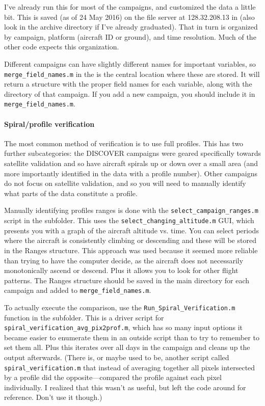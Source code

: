 \documentclass[12pt]{article}
\begin{document}
		I've already run this for most of the campaigns, and customized the data a little bit. This is saved (as of 24 May 2016) on the file server at 128.32.208.13 in  (also look in the archive directory if I've already graduated). That in turn is organized by campaign, platform (aircraft ID or ground), and time resolution. Much of the other code expects this organization. 
		
		Different campaigns can have slightly different names for important variables, so \lstinline$merge_field_names.m$ in the  is the central location where these are stored. It will return a structure with the proper field names for each variable, along with the directory of that campaign. If you add a new campaign, you should include it in \lstinline$merge_field_names.m$.
		
		\paragraph{Spiral/profile verification}
		
		The most common method of verification is to use full profiles. This has two further subcategories: the DISCOVER campaigns were geared specifically towards satellite validation and so have aircraft spirals up or down over a small area (and more importantly identified in the data with a profile number).  Other campaigns do not focus on satellite validation, and so you will need to manually identify what parts of the data constitute a profile.
		
		Manually identifying profiles ranges is done with the \lstinline$select_campaign_ranges.m$ script in the  subfolder. This uses the \lstinline$select_changing_altitude.m$ GUI, which presents you with a graph of the aircraft altitude vs. time. You can select periods where the aircraft is consistently climbing or descending and these will be stored in the Ranges structure. This approach was used because it seemed more reliable than trying to have the computer decide, as the aircraft does not necessarily monotonically ascend or descend. Plus it allows you to look for other flight patterns. The Ranges structure should be saved in the main directory for each campaign and added to \lstinline$merge_field_names.m$.
		
		To actually execute the comparison, use the \lstinline$Run_Spiral_Verification.m$ function in the  subfolder. This is a driver script for \lstinline$spiral_verification_avg_pix2prof.m$, which has so many input options it became easier to enumerate them in an outside script than to try to remember to set them all. Plus this iterates over all days in the campaign and cleans up the output afterwards. (There is, or maybe used to be, another script called \lstinline$spiral_verification.m$ that instead of averaging together all pixels intersected by a profile did the opposite---compared the profile against each pixel individually. I realized that this wasn't as useful, but left the code around for reference. Don't use it though.)
		
\end{document}
